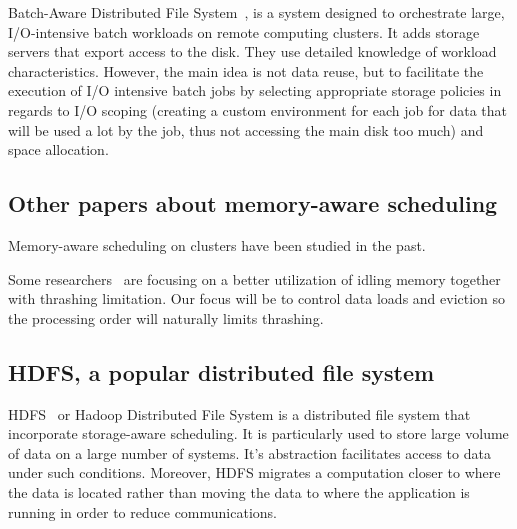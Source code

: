 \documentclass[conference,10pt]{IEEEtran}
\begin{document}
Batch-Aware Distributed File System~\cite{Explicit_Control_in_a_Batch-Aware_Distributed_File_System},
is a system designed to orchestrate large, I/O-intensive batch workloads on remote computing clusters.
It adds storage servers that export access to the disk.
They use detailed knowledge of workload characteristics.
However, the main idea is not data reuse, but to
facilitate the execution of I/O intensive batch
jobs by selecting appropriate storage policies
in regards to I/O scoping (creating a custom environment for each job
for data that will be used a lot by the job, thus not accessing the main disk too
much) and space allocation.


\subsection{Other papers about memory-aware scheduling}
Memory-aware scheduling on clusters have been studied in the past.
 

Some researchers~\cite{Nikolopoulos2003AdaptiveSU}
are focusing on a better utilization of idling memory together with 
thrashing limitation. Our focus will be to control data loads and eviction so the
processing order will naturally limits thrashing.

\subsection{HDFS, a popular distributed file system}
HDFS~\cite{hdfs} or Hadoop Distributed File System is a distributed file system that
incorporate storage-aware scheduling. It is particularly used to store large
volume of data on a large number of systems. It's abstraction facilitates access to data
under such conditions. Moreover, HDFS migrates a computation closer to where the data is
located rather than moving the data to where the application is running in order to reduce communications.
\end{document}

